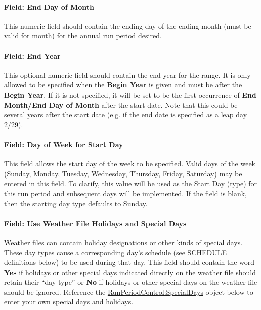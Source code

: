 \paragraph{Field: End Day of Month}\label{field-end-day-of-month-2}

This numeric field should contain the ending day of the ending month (must be valid for month) for the
annual run period desired.

\paragraph{Field: End Year}\label{field-end-year}

This optional numeric field should contain the end year for the range. It is only allowed to be specified
when the \textbf{Begin Year} is given and must be after the \textbf{Begin Year}. If it is not specified,
it will be set to be the first occurrence of \textbf{End Month/End Day of Month} after the start date. Note
that this could be several years after the start date (e.g. if the end date is specified as a leap day 2/29).

\paragraph{Field: Day of Week for Start Day}\label{field-day-of-week-for-start-day-3}

This field allows the start day of the week to be specified. Valid days of the week (Sunday, Monday, Tuesday,
Wednesday, Thursday, Friday, Saturday) may be entered in this field. To clarify, this value will be used as
the Start Day (type) for this run period and subsequent days will be implemented. If the field is blank,
then the starting day type defaults to Sunday.

\paragraph{Field: Use Weather File Holidays and Special Days}\label{field-use-weather-file-holidays-and-special-days-1}

Weather files can contain holiday designations or other kinds of special days. These day types cause a
corresponding day's schedule (see SCHEDULE definitions below) to be used during that day. This field
should contain the word \textbf{Yes} if holidays or other special days indicated directly on the weather
file should retain their ``day type'' or \textbf{No} if holidays or other special days on the weather file
should be ignored. Reference the \hyperref[runperiodcontrolspecialdays]{RunPeriodControl:SpecialDays} object below to enter your own special days
and holidays.

